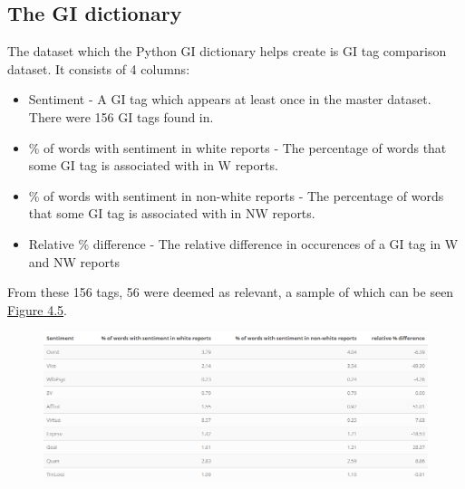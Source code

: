 \documentclass[oneside,12pt]{Classes/RoboticsLaTeX}
\begin{document}
\subsection{The GI dictionary}
The dataset which the Python GI dictionary helps create is GI tag comparison dataset. It consists of 4 columns:
\begin{itemize}
  \item Sentiment - A GI tag which appears at least once in the master dataset. There were 156 GI tags found in.
  \item \% of words with sentiment in white reports - The percentage of words that some GI tag is associated with in W reports.
  \item \% of words with sentiment in non-white reports - The percentage of words that some GI tag is associated with in NW reports.
  \item Relative \% difference - The relative difference in occurences of a GI tag in W and NW reports
\end{itemize}
From these 156 tags, 56 were deemed as relevant, a sample of which can be seen \hyperref[fig:GI_tag_comp]{Figure 4.5}.

\begin{figure}[!htb]
  \centering
  \begin{minipage}{1\textwidth}
    \centering
    \includegraphics[width=1\linewidth]{Figures/enquirer.png}
    \label{fig:GI_tag_comp}
  \end{minipage}%
\end{figure}
\end{document}
